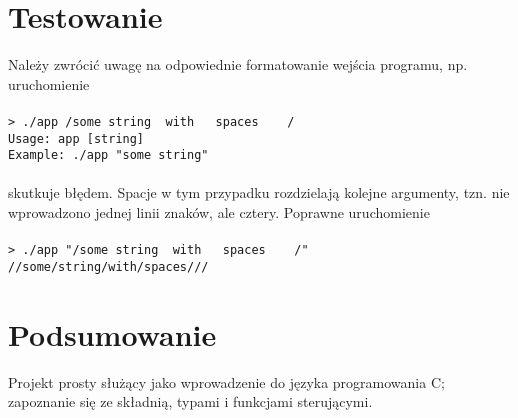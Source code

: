 \documentclass[a4paper, 12pt]{article}
\begin{document}
\section*{Testowanie}
Należy zwrócić uwagę na odpowiednie formatowanie wejścia programu, np. uruchomienie
\\\\
\lstinline{> ./app /some string  with   spaces    /}\\
\lstinline{Usage: app [string]}\\
\lstinline{Example: ./app "some string"}
\\\\
skutkuje błędem. Spacje w tym przypadku rozdzielają kolejne argumenty, tzn. nie wprowadzono jednej linii znaków, ale cztery. Poprawne uruchomienie
\\\\
\lstinline{> ./app "/some string  with   spaces    /"}\\
\lstinline{//some/string/with/spaces///}

\section*{Podsumowanie}
Projekt prosty służący jako wprowadzenie do języka programowania C; zapoznanie się ze składnią, typami i funkcjami sterującymi.
\end{document}
